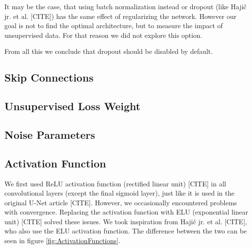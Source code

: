 It may be the case, that using batch normalization instead or dropout (like Hajič jr. et al. [CITE]) has the same effect of regularizing the network. However our goal is not to find the optimal architecture, but to measure the impact of unsupervised data. For that reason we did not explore this option.

From all this we conclude that dropout should be disabled by default.


\subsection{Skip Connections}
\label{sec:SkipConnections}



\subsection{Unsupervised Loss Weight}
\label{sec:UnsupervisedLossWeight}



\subsection{Noise Parameters}
\label{sec:NoiseParameters}



\subsection{Activation Function}
\label{sec:ActivationFunction}

We first used ReLU activation function (rectified linear unit) [CITE] in all convolutional layers (except the final sigmoid layer), just like it is used in the original U-Net article [CITE]. However, we occasionally encountered problems with convergence. Replacing the activation function with ELU (exponential linear unit) [CITE] solved these issues. We took inspiration from Hajič jr. et al. [CITE], who also use the ELU activation function. The difference between the two can be seen in figure \ref{fig:ActivationFunctions}.

